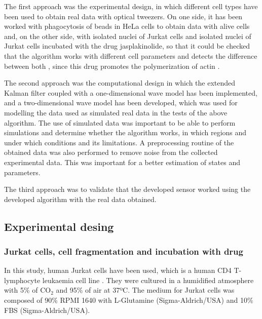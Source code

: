 \documentclass[12pt, a4paper]{article} %
\begin{document}
	The first approach was the experimental design, in which different cell types have been used to obtain real data with optical tweezers. On one side, it has been worked with phagocytosis of beads in HeLa cells \cite{gey1952tissue} to obtain data with alive cells and, on the other side, with isolated nuclei of Jurkat cells \cite{schneider1977characterization, gioia2018genome} and isolated nuclei of Jurkat cells incubated with the drug jasplakinolide, so that it could be checked that the algorithm works with different cell parameters and detects the difference between both \cite{andersen2002directed}, since this drug promotes the polymerization of actin \cite{holzinger2001jasplakinolide}.
	
	The second approach was the computational design in which the extended Kalman filter coupled with a one-dimensional wave model has been implemented, and a two-dimensional wave model has been developed, which was used for modelling the data used as simulated real data in the tests of the above algorithm.  The use of simulated data was important to be able to perform simulations and determine whether the algorithm works, in which regions and under which conditions and its limitations. A preprocessing routine of the obtained data was also performed to remove noise from the collected experimental data. This was important for a better estimation of states and parameters.
	
	The third approach was to validate that the developed sensor worked using the developed algorithm with the real data obtained. 
	
	\setlength{\parskip}{0mm}
	
	\subsection{Experimental desing}
	
	\subsubsection{Jurkat cells, cell fragmentation and incubation with drug}
	
	In this study, human Jurkat cells have been used,  which is a human CD4 T-lymphocyte leukaemia cell line \cite{schneider1977characterization}. They were cultured in a humidified atmosphere with 5\% of CO$_{2}$ and 95\% of air at 37ºC. The medium for Jurkat cells was composed of 90\% RPMI 1640 with L-Glutamine (Sigma-Aldrich/USA) and 10\% FBS (Sigma-Aldrich/USA).
	
\end{document}
